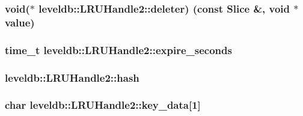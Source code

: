 \subsubsection[{deleter}]{\setlength{\rightskip}{0pt plus 5cm}void($\ast$ leveldb\+::\+L\+R\+U\+Handle2\+::deleter) (const {\bf Slice} \&, void $\ast${\bf value})}\label{structleveldb_1_1_l_r_u_handle2_a2504959e08f60490317bf177f2d94b32}
\hypertarget{structleveldb_1_1_l_r_u_handle2_a642dcf5f7af626ff903364859e15bbca}{}
\subsubsection[{expire\+\_\+seconds}]{\setlength{\rightskip}{0pt plus 5cm}time\+\_\+t leveldb\+::\+L\+R\+U\+Handle2\+::expire\+\_\+seconds}\label{structleveldb_1_1_l_r_u_handle2_a642dcf5f7af626ff903364859e15bbca}
\hypertarget{structleveldb_1_1_l_r_u_handle2_ab12731b19c2020889befba920e0a3151}{}
\subsubsection[{hash}]{ leveldb\+::\+L\+R\+U\+Handle2\+::hash}\label{structleveldb_1_1_l_r_u_handle2_ab12731b19c2020889befba920e0a3151}
\hypertarget{structleveldb_1_1_l_r_u_handle2_a51ec4315b8979eec6b57fad1fe4dd4f0}{}
\subsubsection[{key\+\_\+data}]{\setlength{\rightskip}{0pt plus 5cm}char leveldb\+::\+L\+R\+U\+Handle2\+::key\+\_\+data\mbox{[}1\mbox{]}}\label{structleveldb_1_1_l_r_u_handle2_a51ec4315b8979eec6b57fad1fe4dd4f0}
\hypertarget{structleveldb_1_1_l_r_u_handle2_a7387d7e513de3790db6f600a530b629e}{}
